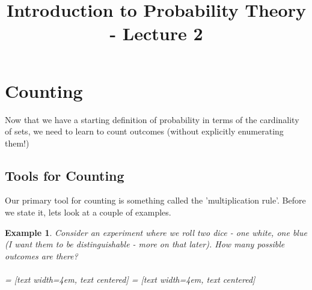 \documentclass[12pt]{article} %
\title{Introduction to Probability Theory - Lecture 2}
\newtheorem{example}{Example}
\begin{document}
\maketitle
\section{Counting}
Now that we have a starting definition of probability in terms of the cardinality of sets, we need to learn to count outcomes (without explicitly enumerating them!)
\subsection{Tools for Counting}
Our primary tool for counting is something called the 'multiplication rule'. Before we state it, lets look at a couple of examples.
\begin{example}
Consider an experiment where we roll two dice - one white, one blue (I want them to be \emph{distinguishable} - more on that later). How many possible outcomes are there? \\\\

 = [text width=4em, text centered]
 = [text width=4em, text centered]



\end{example}
\end{document}
